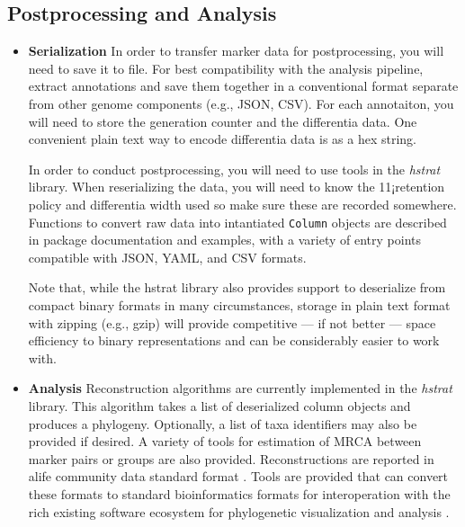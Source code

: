 \subsection{Postprocessing and Analysis}
\begin{itemize}
\item \textbf{Serialization}
In order to transfer marker data for postprocessing, you will need to save it to file.
For best compatibility with the analysis pipeline, extract annotations and save them together in a conventional format separate from other genome components (e.g., JSON, CSV).
For each annotaiton, you will need to store the generation counter and the differentia data.
One convenient plain text way to encode differentia data is as a hex string.

In order to conduct postprocessing, you will need to use tools in the \textit{hstrat} library.
When reserializing the data, you will need to know the 11¡retention policy and differentia width used so make sure these are recorded somewhere.
Functions to convert raw data into intantiated \texttt{Column} objects are described in package documentation and examples, with a variety of entry points compatible with JSON, YAML, and CSV formats.

Note that, while the hstrat library also provides support to deserialize from compact binary formats in many circumstances, storage in plain text format with zipping (e.g., gzip) will provide competitive --- if not better --- space efficiency to binary representations and can be considerably easier to work with.

\item \textbf{Analysis}
Reconstruction algorithms are currently implemented in the \textit{hstrat} library.
This algorithm takes a list of deserialized column objects and produces a phylogeny.
Optionally, a list of taxa identifiers may also be provided if desired.
A variety of tools for estimation of MRCA between marker pairs or groups are also provided.
Reconstructions are reported in alife community data standard format \citep{TODO}.
Tools are provided that can convert these formats to standard bioinformatics formats for interoperation with the rich existing software ecosystem for phylogenetic visualization and analysis \citep{TODOalifedataphyloinformaticsconvert}.
\end{itemize}
